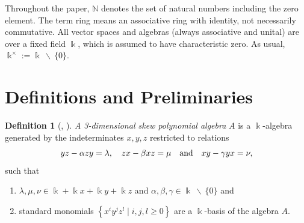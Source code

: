 \documentclass{amsart}
\theoremstyle{definition}
\newtheorem{definition}[theorem]{Definition}
\theoremstyle{remark}
\numberwithin{equation}{section}
\begin{document}
Throughout the paper, $\mathbb{N}$ denotes the set of natural numbers including the zero element. The term ring means an associative ring with identity, not necessarily commutative. All vector spaces and algebras (always associative and unital) are over a fixed field $\Bbbk$, which is assumed to have characteristic zero. As usual, $\Bbbk^{\times} := \Bbbk \ \backslash \ \{0\}$.


\section{Definitions and Preliminaries}\label{Preliminaries}

\begin{definition}[{\cite{BellSmith1990}, \cite[Definition C4.3]{Rosenberg1995}}]\label{3dimensionaldimension}
\textit{A 3-dimensional skew polynomial algebra} $A$ is a $\Bbbk$-algebra generated by the indeterminates $x,y,z$ restricted to relations 
$$
yz - \alpha zy = \lambda,\quad zx - \beta xz = \mu \quad {\rm and} \quad xy - \gamma yx = \nu,
$$ 
such that
\begin{enumerate}
\item [\rm (i)] $\lambda, \mu, \nu\in \Bbbk+\Bbbk x+\Bbbk y+\Bbbk z$ and $\alpha, \beta, \gamma \in \Bbbk\ \backslash\ \{0\}$ and

\item [\rm (ii)] standard monomials $\left\{x^iy^jz^l\mid i,j,l\ge 0\right\}$ are a $\Bbbk$-basis of the algebra $A$.
\end{enumerate}
\end{definition}
\end{document}

